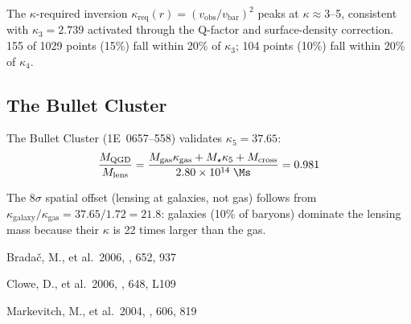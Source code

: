 The $\kappa$-required inversion $\kappa_{\mathrm{req}}(r) = (v_{\mathrm{obs}}/v_{\mathrm{bar}})^2$ peaks at $\kappa \approx 3$--5, consistent with $\kappa_3 = 2.739$ activated through the Q-factor and surface-density correction.  155 of 1029 points (15\%) fall within 20\% of $\kappa_3$; 104 points (10\%) fall within 20\% of $\kappa_4$.

\subsection{The Bullet Cluster}

The Bullet Cluster (1E~0657--558) validates $\kappa_5 = 37.65$:
\begin{equation}
  \frac{M_{\mathrm{QGD}}}{M_{\mathrm{lens}}} = \frac{M_{\mathrm{gas}}\kappa_{\mathrm{gas}} + M_\star\kappa_5 + M_{\mathrm{cross}}}{2.80\times10^{14}\;\Ms} = 0.981
\end{equation}

The 8$\sigma$ spatial offset (lensing at galaxies, not gas) follows from $\kappa_{\mathrm{galaxy}}/\kappa_{\mathrm{gas}} = 37.65/1.72 = 21.8$: galaxies (10\% of baryons) dominate the lensing mass because their $\kappa$ is 22 times larger than the gas.

\begin{references}
  Bradač, M., et al.\ 2006, \apj, 652, 937

  Clowe, D., et al.\ 2006, \apjl, 648, L109

  Markevitch, M., et al.\ 2004, \apj, 606, 819
\end{references}
